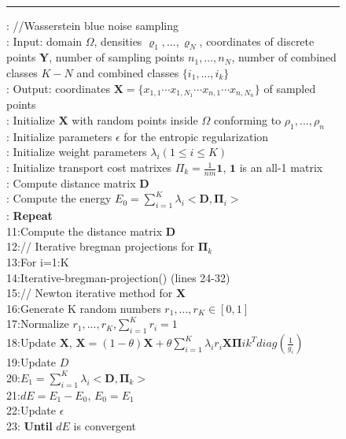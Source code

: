\begin{figure}[htb]
\rule{0.5\textwidth}{0.4pt}
 : //Wasserstein blue noise sampling\\
: Input: domain $\Omega$, densities $\varrho_1,...,\varrho_N$, coordinates of discrete points $\mathbf{Y}$,
  number of sampling points $n_1,...,n_N$,
  number of combined classes $K-N$ and combined classes $\{i_1,...,i_k\}$\\
: Output: coordinates $\mathbf{X}=\{x_{1,1} \cdots  x_{1,N_1} \cdots x_{n,1} \cdots x_{n,N_n}\}$  of sampled points\\
: Initialize $\mathbf{X}$ with random points inside $\Omega$ conforming to $\rho_1,...,\rho_n$ \\
: Initialize parameters $\epsilon$ for the entropic regularization\\
: Initialize weight parameters $\lambda_i(1\leq i \leq K)$\\
: Initialize transport cost matrixes $\Pi_k=\frac{1}{nm}\mathbf{1}$, $\mathbf{1}$ is an all-1 matrix\\
: Compute distance matrix $\mathbf D$\\
: Compute the energy $E_0=\sum_{i=1}^K\lambda_i<\mathbf D,\mathbf{\Pi}_i>$\\
: \textbf{Repeat}\\
11:\quad Compute the distance matrix $\mathbf{D}$ \\
12:\quad // Iterative bregman projections for $\mathbf{\Pi}_k$\\
13:\quad For i=1:K \\
14:\quad \quad  Iterative-bregman-projection() (lines 24-32) \\
15:\quad // Newton iterative method for $\mathbf{X}$ \\
16:\quad Generate K random numbers $r_1,...,r_K\in[0,1]$\\
17:\quad Normalize $r_1,...,r_K$,$\sum_{i=1}^Kr_i=1$\\
18:\quad Update $\mathbf X$, $\mathbf X=(1-\theta)\mathbf X+\theta\sum_{i=1}^K\lambda_ir_i\mathbf{X}\mathbf{\Pi}ik^Tdiag(\frac{1}{g_i})$\\
19:\quad Update $D$\\
20:\quad $E_1=\sum_{i=1}^K\lambda_i<\mathbf{D},\mathbf{\Pi}_k>$ \\
21:\quad $dE=E_1-E_0$, $E_0=E_1$\\
22:\quad Update $\epsilon$ \\
23: \textbf{Until} $dE$ is convergent \\


\end{figure}
